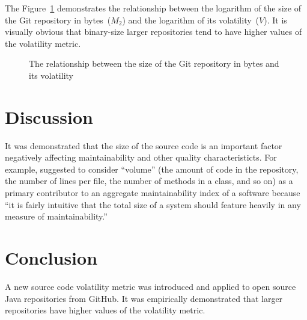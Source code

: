 \documentclass[sigconf]{acmart}
\begin{document}
The Figure~\ref{fig:2} demonstrates the relationship between
the logarithm of the size of the Git repository in bytes~($M_2$) and
the logarithm of its volatility~($V$).
It is visually obvious that
binary-size larger repositories tend to have higher values
of the volatility metric.

\begin{figure}[h]
  
  \caption{The relationship between the size of the Git repository in bytes and its volatility}
  \label{fig:2}
\end{figure}

\section{Discussion}
\label{sec:discussion}

It was demonstrated that the size of the source code is an important
factor negatively affecting maintainability and other quality characteristicts.
For example, \citet{heitlager2007} suggested to consider ``volume'' (the amount of code
in the repository, the number of lines per file, the number of methods in a class,
and so on) as a primary contributor to an aggregate maintainability index
of a software because ``it is fairly intuitive that the total size of a system should
feature heavily in any measure of maintainability.''

\section{Conclusion}
\label{sec:conclusion}

A new source code volatility metric was introduced and applied
to \thetotalrepos{} open source Java repositories from GitHub. It was
empirically demonstrated that larger repositories have higher values
of the volatility metric.




\end{document}
